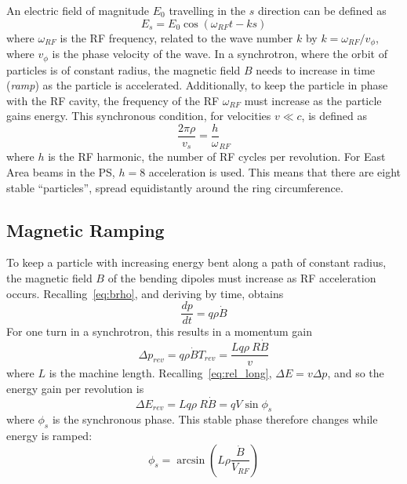 \documentclass[11pt]{report}
\begin{document}
An electric field of magnitude $E_0$ travelling in the $s$ direction can be defined as
\begin{equation}
  E_s = E_0\cos(\omega_{RF}t-ks)
\end{equation} where $\omega_{RF}$ is the RF frequency, related to the wave number $k$ by $k=\omega_{RF}/v_\phi$, where $v_\phi$ is the phase velocity of the wave. In a synchrotron, where the orbit of particles is of constant radius, the magnetic field $B$ needs to increase in time (\textit{ramp}) as the particle is accelerated. Additionally, to keep the particle in phase with the RF cavity, the frequency of the RF $\omega_{RF}$ must increase as the particle gains energy. This synchronous condition, for velocities $v\ll c$, is defined as
\begin{equation}
  \frac{2\pi\rho}{v_s}=\frac h\omega_{RF}
\end{equation} where $h$ is the RF harmonic, the number of RF cycles per revolution. For East Area beams in the PS, $h=8$ acceleration is used. This means that there are eight stable ``particles'', spread equidistantly around the ring circumference. 

\subsection{Magnetic Ramping}

To keep a particle with increasing energy bent along a path of constant radius, the magnetic field $B$ of the bending dipoles must increase as RF acceleration occurs. Recalling~\autoref{eq:brho}, and deriving by time, obtains
\begin{equation}
  \frac{dp}{dt} = q\rho\dot B
\end{equation}
For one turn in a synchrotron, this results in a momentum gain
\begin{equation}
  \Delta p_{rev} = q\rho\dot B T_{rev}=\frac{Lq\rho~R\dot B}v
\end{equation} where $L$ is the machine length. Recalling~\autoref{eq:rel_long}, $\Delta E=v\Delta p$, and so the energy gain per revolution is
\begin{equation}
  \Delta E_{rev} = Lq\rho~R\dot B=qV\sin \phi_s
  \label{eq:ef_sin}
\end{equation} where $\phi_s$ is the synchronous phase. This stable phase therefore changes while energy is ramped:
\begin{equation}
  \phi_s=\arcsin\left(L\rho\frac{\dot B}{V_{RF}}\right)
  \label{eq:sync_phase}
\end{equation}
\end{document}
